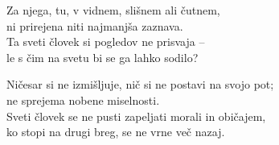 Za njega, tu, v vidnem, slišnem ali čutnem,\\
ni prirejena niti najmanjša zaznava.\\
Ta sveti človek si pogledov ne prisvaja --\\
le s čim na svetu bi se ga lahko sodilo?

Ničesar si ne izmišljuje, nič si ne postavi na svojo pot;\\
ne sprejema nobene miselnosti.\\
Sveti človek se ne pusti zapeljati morali in običajem,\\
ko stopi na drugi breg, se ne vrne več nazaj.

